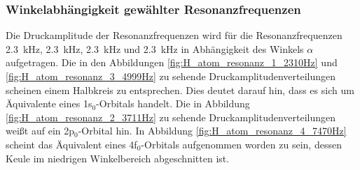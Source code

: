         \subsubsection*{Winkelabhängigkeit gewählter Resonanzfrequenzen}
            Die Druckamplitude der Resonanzfrequenzen wird für die Resonanzfrequenzen \SI{2.3}{\kilo\hertz}, \SI{2.3}{\kilo\hertz}, \SI{2.3}{\kilo\hertz} und \SI{2.3}{\kilo\hertz} in Abhängigkeit des Winkels
            $\alpha$ aufgetragen. Die in den Abbildungen \ref{fig:H_atom_resonanz_1_2310Hz} und \ref{fig:H_atom_resonanz_3_4999Hz} zu sehende Druckamplitudenverteilungen scheinen einem Halbkreis zu entsprechen. 
            Dies deutet darauf hin, dass es sich um Äquivalente eines 1s$_0$-Orbitals handelt. Die in Abbildung \ref{fig:H_atom_resonanz_2_3711Hz} zu sehende Druckamplitudenverteilungen weißt auf ein 
            2p$_0$-Orbital hin. In Abbildung \ref{fig:H_atom_resonanz_4_7470Hz} scheint das Äquivalent eines 4f$_0$-Orbitals aufgenommen worden zu sein, dessen Keule im niedrigen Winkelbereich abgeschnitten 
            ist.
            \FloatBarrier
